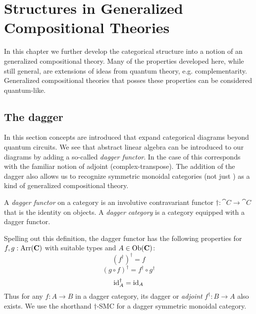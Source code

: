 \chapter{Structures in Generalized Compositional Theories}
\label{chap:cqm}

\todo{\chapabstract{}}

In this chapter we further develop the categorical structure into a notion of an generalized compositional theory. Many of the properties developed here, while still general, are extensions of ideas from quantum theory, e.g. complementarity.  Generalized compositional theories that posses these properties can be considered quantum-like.

\section{The dagger}
In this section concepts are introduced that expand categorical diagrams beyond quantum circuits. We see that abstract linear algebra can be introduced to our diagrams by adding a so-called \emph{dagger functor}.  In the case of  this corresponds with the familiar notion of adjoint (complex-transpose).  The addition of the dagger also allows us to recognize symmetric monoidal categories (not just ) as a kind of generalized compositional theory. 

\begin{defn}
\label{defn:dagger}
A \emph{dagger functor} on a category  is an involutive contravariant functor $\dagger:\cat{C}\to\cat{C}$ that is the identity on objects. A \emph{dagger category} is a category equipped with a dagger functor.
\end{defn}
Spelling out this definition, the dagger functor has the following properties for $f,g:\mbox{Arr}(\mathbf{C})$ with suitable types and $A\in\mbox{Ob}(\mathbf{C})$:
\begin{equation}
\left(f^{\dagger}\right)^{\dagger} = f 
\end{equation}
\begin{equation}
(g\circ f)^{\dagger} = f^{\dagger}\circ g^{\dagger}
\end{equation}
\begin{equation}
\mbox{id}_{A}^{\dagger} = \mbox{id}_{A}
\end{equation}
Thus for any $f:A\to B$ in a dagger category, its dagger or \emph{adjoint} $f^{\dagger}:B\to A$ also exists. We use the shorthand $\dagger$-SMC for a dagger symmetric monoidal category.

